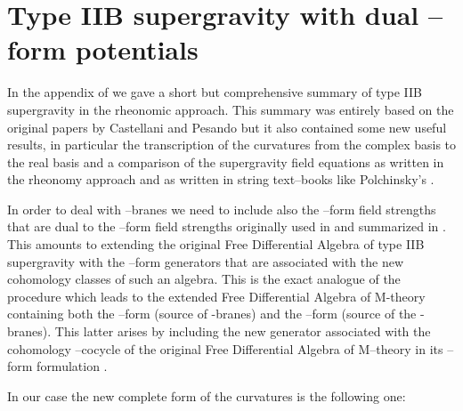 \documentclass[a4paper,11pt]{article}
\begin{document}
\section{Type IIB supergravity with dual \coordHE{}--form potentials}
In the appendix \coordHE{} of \cite{noidued3} we gave
a short but comprehensive summary of type IIB supergravity in the
rheonomic approach. This summary was entirely based on the original papers by
Castellani and Pesando \cite{castella2b,igorleo} but it also contained
some new useful results, in particular the transcription of the
curvatures from the complex \coordHE{} basis to the real
\coordHE{} basis and a comparison of the
supergravity field equations as written in the rheonomy approach and
as written in string text--books like Polchinsky's \cite{polchinski}.
\par
In order to deal with \coordHE{}--branes we need to include also the
\coordHE{}--form field strengths that are dual to the \coordHE{}--form field
strengths originally used in \cite{castella2b,igorleo} and summarized
in \cite{noidued3}. This amounts to extending the original Free
Differential Algebra of type IIB supergravity with the \coordHE{}--form
generators that are associated with the new cohomology classes of
such an algebra. This is the exact analogue of the procedure which
leads to the extended  Free Differential Algebra of M-theory
\cite{pietd11} containing both
the \coordHE{}--form (source of \coordHE{}-branes) and the \coordHE{}--form (source of the \coordHE{}-branes). This latter arises
by including the new generator associated with the cohomology \coordHE{}--cocycle of the
original Free Differential Algebra of M--theory in its \coordHE{}--form
formulation \cite{riccapiet}.
\par
In our case the new complete form of the curvatures is the following
one:
\end{document}
